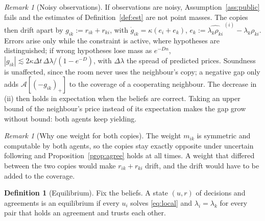 \documentclass[11pt]{article}
\theoremstyle{definition}
\newtheorem{definition}[theorem]{Definition}
\theoremstyle{remark}
\newtheorem{remark}[theorem]{Remark}
\newcommand{\A}{\mathcal{A}}
\newcommand{\est}[2]{\widehat{#1}^{\,(#2)}}
\begin{document}
\begin{remark}[Noisy observations]\label{rem:noisy}
If observations are noisy, Assumption~\ref{ass:public} fails and the estimates of Definition~\ref{def:est} are not point masses. The copies then drift apart by $g_{ik}:=r_{ik}+r_{ki}$, with $\dot g_{ik}=\kappa(e_i+e_k)$, $e_k:=\est{\lambda_k\rho_{ki}}{i}-\lambda_k\rho_{ki}$. Errors arise only while the constraint is active, where hypotheses are distinguished; if wrong hypotheses lose mass as $e^{-Dn}$, $|g_{ik}|\lesssim2\kappa\Delta t\,\Delta\lambda/(1-e^{-D})$, with $\Delta\lambda$ the spread of predicted prices. Soundness is unaffected, since the room never uses the neighbour's copy; a negative gap only adds $\A[(-g_{ik})_+]$ to the coverage of a cooperating neighbour. The decrease in (ii) then holds in expectation when the beliefs are correct. Taking an upper bound of the neighbour's price instead of its expectation makes the gap grow without bound: both agents keep yielding.
\end{remark}

\begin{remark}[Why one weight for both copies]\label{rem:uncertain}
The weight $m_{ik}$ is symmetric and computable by both agents, so the copies stay exactly opposite under uncertain following and Proposition~\ref{prop:agree} holds at all times. A weight that differed between the two copies would make $r_{ik}+r_{ki}$ drift, and the drift would have to be added to the coverage.
\end{remark}

\begin{definition}[Equilibrium]
Fix the beliefs. A state $(u,r)$ of decisions and agreements is an equilibrium if every $u_i$ solves \eqref{eq:local} and $\lambda_i=\lambda_k$ for every pair that holds an agreement and trusts each other.
\end{definition}
\end{document}
